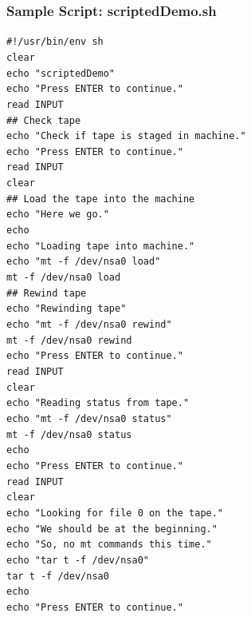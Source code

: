 \subsubsection{Sample Script:  scriptedDemo.sh}
\texttt{\#!/usr/bin/env sh\\
clear \\
echo "scriptedDemo"\\
echo "Press ENTER to continue."\\
read INPUT\\
\#\# Check tape\\
echo "Check if tape is staged in machine."\\
echo "Press ENTER to continue."\\
read INPUT\\
clear\\
\#\# Load the tape into the machine\\
echo "Here we go."\\
echo\\
echo "Loading tape into machine."\\
echo "mt -f /dev/nsa0 load"\\
mt -f /dev/nsa0 load\\
\#\# Rewind tape\\
echo "Rewinding tape"\\
echo "mt -f /dev/nsa0 rewind"\\
mt -f /dev/nsa0 rewind\\
echo "Press ENTER to continue."\\
read INPUT\\
clear\\
echo "Reading status from tape."\\
echo "mt -f /dev/nsa0 status"\\
mt -f /dev/nsa0 status\\
echo\\
echo "Press ENTER to continue."\\
read INPUT\\
clear\\
echo "Looking for file 0 on the tape."\\
echo "We should be at the beginning."\\
echo "So, no mt commands this time."\\
echo "tar t -f /dev/nsa0"\\
tar t -f /dev/nsa0\\
echo\\
echo "Press ENTER to continue."\\
}
